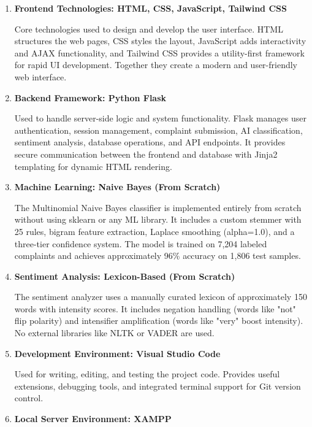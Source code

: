 \documentclass[12pt,a4paper]{report}
\begin{document}
\begin{enumerate}[nolistsep]
    \item \textbf{Frontend Technologies: HTML, CSS, JavaScript, Tailwind CSS}
    
    Core technologies used to design and develop the user interface. HTML structures the web pages, CSS styles the layout, JavaScript adds interactivity and AJAX functionality, and Tailwind CSS provides a utility-first framework for rapid UI development. Together they create a modern and user-friendly web interface.
    
    \item \textbf{Backend Framework: Python Flask}
    
    Used to handle server-side logic and system functionality. Flask manages user authentication, session management, complaint submission, AI classification, sentiment analysis, database operations, and API endpoints. It provides secure communication between the frontend and database with Jinja2 templating for dynamic HTML rendering.
    
    \item \textbf{Machine Learning: Naive Bayes (From Scratch)}
    
    The Multinomial Naive Bayes classifier is implemented entirely from scratch without using sklearn or any ML library. It includes a custom stemmer with 25 rules, bigram feature extraction, Laplace smoothing (alpha=1.0), and a three-tier confidence system. The model is trained on 7,204 labeled complaints and achieves approximately 96\% accuracy on 1,806 test samples.
    
    \item \textbf{Sentiment Analysis: Lexicon-Based (From Scratch)}
    
    The sentiment analyzer uses a manually curated lexicon of approximately 150 words with intensity scores. It includes negation handling (words like "not" flip polarity) and intensifier amplification (words like "very" boost intensity). No external libraries like NLTK or VADER are used.
    
    \item \textbf{Development Environment: Visual Studio Code}
    
    Used for writing, editing, and testing the project code. Provides useful extensions, debugging tools, and integrated terminal support for Git version control.
    
    \item \textbf{Local Server Environment: XAMPP}
    

\end{enumerate}
\end{document}
